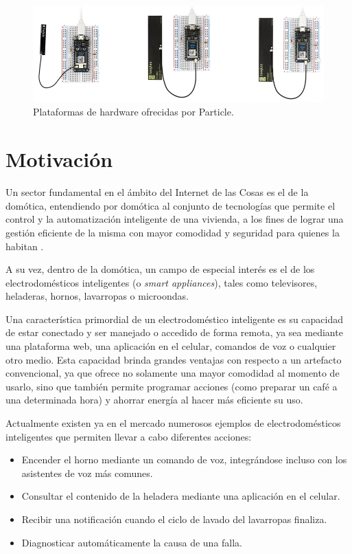 \begin{figure}[h]
\centering
\includegraphics[scale=0.4]{./Figures/particle_iot.png}
\caption[Plataformas de hardware ofrecidas por Particle.]{Plataformas de hardware ofrecidas por Particle.\footnotemark}
\label{fig:particle_iot}
\end{figure}



\section{Motivación{}}

Un sector fundamental en el ámbito del Internet de las Cosas es el de la domótica, entendiendo por domótica al conjunto de tecnologías que permite el control y la automatización inteligente de una vivienda, a los fines de lograr una gestión eficiente de la misma con mayor comodidad y seguridad para quienes la habitan \citep{6}.

A su vez, dentro de la domótica, un campo de especial interés es el de los electrodomésticos inteligentes (o \emph{smart appliances}), tales como televisores, heladeras, hornos, lavarropas o microondas. 

Una característica primordial de un electrodoméstico inteligente es su capacidad de
estar conectado y ser manejado o accedido de forma remota, ya sea mediante una plataforma web, una aplicación en el celular, comandos de voz o cualquier otro medio. Esta capacidad brinda grandes ventajas con respecto a un artefacto convencional, ya que ofrece no solamente una mayor comodidad al momento de usarlo, sino que también permite programar acciones (como preparar un café a una determinada hora) y ahorrar energía al hacer más eficiente su uso.

Actualmente existen ya en el mercado numerosos ejemplos de electrodomésticos inteligentes que permiten llevar a cabo diferentes acciones:
\begin{itemize}
	\item Encender el horno mediante un comando de voz, integrándose incluso con los asistentes de voz más comunes.
	\item Consultar el contenido de la heladera mediante una aplicación en el celular.
	\item Recibir una notificación cuando el ciclo de lavado del lavarropas finaliza.
	\item Diagnosticar automáticamente la causa de una falla.
\end{itemize}

